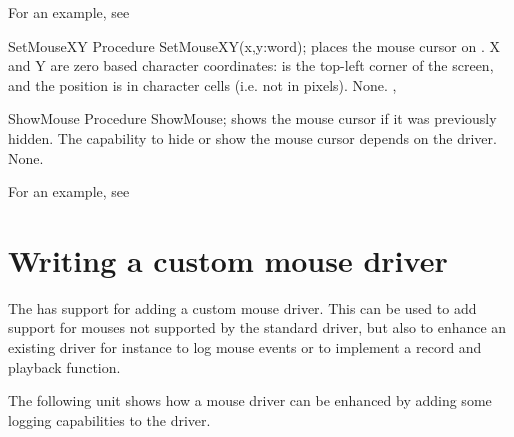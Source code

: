 For an example, see 

\begin{procedure}{SetMouseXY}
\Declaration
Procedure SetMouseXY(x,y:word); 
\Description
{} places the mouse cursor on . X and Y are zero
based character coordinates:  is the top-left corner of the screen,
and the position is in character cells (i.e. not in pixels).
\Errors
None.
\SeeAlso
{}, 
\end{procedure}


\begin{procedure}{ShowMouse}
\Declaration
Procedure ShowMouse; 
\Description
{} shows the mouse cursor if it was previously hidden. The
capability to hide or show the mouse cursor depends on the driver.
\Errors
None.
\SeeAlso
{}
\end{procedure}

For an example, see 

\section{Writing a custom mouse driver}
\label{se:mousedrv}
The  has support for adding a custom mouse driver. This can be
used to add support for mouses not supported by the standard \fpc{} driver,
but also to enhance an existing driver for instance to log mouse events or
to implement a record and playback function. 

The following unit shows how a mouse driver can be enhanced by adding some
logging capabilities to the driver.
